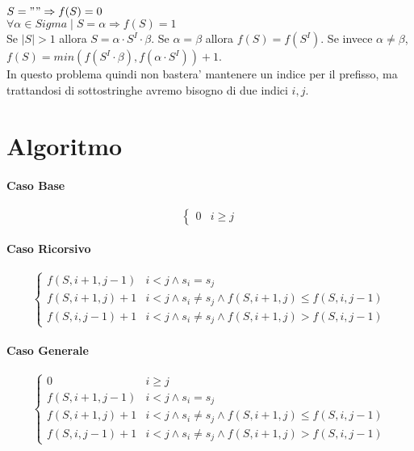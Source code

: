$S = "" \Rightarrow f(S) = 0$ \\
$\forall \alpha \in Sigma \mid S = \alpha \Rightarrow f(S) = 1$ \\

Se $|S| > 1$ allora $S = \alpha \cdot S^{I} \cdot \beta$.
Se $\alpha = \beta$ allora $f(S) = f(S^{I})$.
Se invece $\alpha \ne \beta$,
$f(S) = min(f(S^{I} \cdot \beta), f(\alpha \cdot S^{I})) + 1$. \\

In questo problema quindi non bastera' mantenere un indice per il prefisso, ma trattandosi di sottostringhe avremo bisogno di due indici $i, j$.

\section{Algoritmo}

\paragraph{Caso Base}

\[
    \begin{cases}
        \text{$0$} & \text{$i \geq j$}
    \end{cases}
\]

\paragraph{Caso Ricorsivo}

\[
    \begin{cases}
        \text{$f(S, i+1, j-1)$} & \text{$i < j \land s_i = s_j$} \\
        \text{$f(S, i+1, j) + 1$} & \text{$i < j \land s_i \ne s_j \land f(S, i+1, j) \leq f(S, i, j-1)$} \\
        \text{$f(S, i, j-1) + 1$} & \text{$i < j \land s_i \ne s_j \land f(S, i+1, j) > f(S, i, j-1)$}
    \end{cases}
\]

\paragraph{Caso Generale}

\[
    \begin{cases}
        \text{$0$} & \text{$i \geq j$} \\
        \text{$f(S, i+1, j-1)$} & \text{$i < j \land s_i = s_j$} \\
        \text{$f(S, i+1, j) + 1$} & \text{$i < j \land s_i \ne s_j \land f(S, i+1, j) \leq f(S, i, j-1)$} \\
        \text{$f(S, i, j-1) + 1$} & \text{$i < j \land s_i \ne s_j \land f(S, i+1, j) > f(S, i, j-1)$}
     \end{cases}
\]

